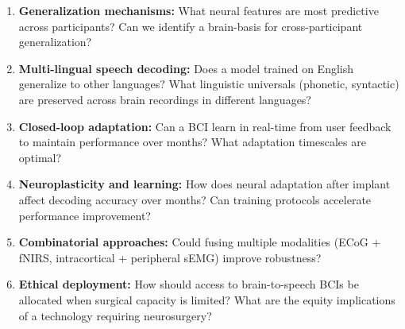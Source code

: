 \begin{enumerate}
    \item \textbf{Generalization mechanisms:} What neural features are most predictive across participants? Can we identify a brain-basis for cross-participant generalization?
    
    \item \textbf{Multi-lingual speech decoding:} Does a model trained on English generalize to other languages? What linguistic universals (phonetic, syntactic) are preserved across brain recordings in different languages?
    
    \item \textbf{Closed-loop adaptation:} Can a BCI learn in real-time from user feedback to maintain performance over months? What adaptation timescales are optimal?
    
    \item \textbf{Neuroplasticity and learning:} How does neural adaptation after implant affect decoding accuracy over months? Can training protocols accelerate performance improvement?
    
    \item \textbf{Combinatorial approaches:} Could fusing multiple modalities (ECoG + fNIRS, intracortical + peripheral sEMG) improve robustness?
    
    \item \textbf{Ethical deployment:} How should access to brain-to-speech BCIs be allocated when surgical capacity is limited? What are the equity implications of a technology requiring neurosurgery?
\end{enumerate}

